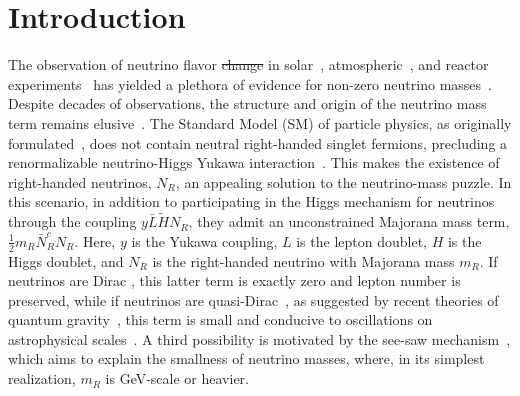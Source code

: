 \documentclass[
    aps,
    prd,
    reprint,
    amsmath,
    amssymb,
    nofootinbib,
    superscriptaddress,
    floatfix
]{revtex4-2}
\providecommand{\DIFaddtex}[1]{{\protect\color{blue}\uwave{#1}}} %
\providecommand{\DIFdeltex}[1]{{\protect\color{red}\sout{#1}}}                      %
\providecommand{\DIFaddbegin}{} %
\providecommand{\DIFaddend}{} %
\providecommand{\DIFdelbegin}{} %
\providecommand{\DIFdelend}{} %
\providecommand{\DIFadd}[1]{\texorpdfstring{\DIFaddtex{#1}}{#1}} %
\providecommand{\DIFdel}[1]{\texorpdfstring{\DIFdeltex{#1}}{}} %
\newcommand{\DIFscaledelfig}{0.5}
\newlength{\DIFdelgraphicswidth} %
\newlength{\DIFdelgraphicsheight} %
\newcommand{\DIFaddincludegraphics}[2][]{{\color{blue}\fbox{\DIFOincludegraphics[#1]{#2}}}} %
\newcommand{\DIFdelincludegraphics}[2][]{%
\sbox{\DIFdelgraphicsbox}{\DIFOincludegraphics[#1]{#2}}%
\settoboxwidth{\DIFdelgraphicswidth}{\DIFdelgraphicsbox} %
\settoboxtotalheight{\DIFdelgraphicsheight}{\DIFdelgraphicsbox} %
\scalebox{\DIFscaledelfig}{%
\parbox[b]{\DIFdelgraphicswidth}{\usebox{\DIFdelgraphicsbox}\\[-\baselineskip] \rule{\DIFdelgraphicswidth}{0em}}\llap{\resizebox{\DIFdelgraphicswidth}{\DIFdelgraphicsheight}{%
\setlength{\unitlength}{\DIFdelgraphicswidth}%
\begin{picture}(1,1)%
\thicklines\linethickness{2pt} %
{\color[rgb]{1,0,0}\put(0,0){\framebox(1,1){}}}%
{\color[rgb]{1,0,0}\put(0,0){\line( 1,1){1}}}%
{\color[rgb]{1,0,0}\put(0,1){\line(1,-1){1}}}%
\end{picture}%
}\hspace*{3pt}}} %
} %
\DeclareRobustCommand{\DIFaddbegin}{\DIFOaddbegin \let\includegraphics\DIFaddincludegraphics} %
\DeclareRobustCommand{\DIFaddend}{\DIFOaddend \let\includegraphics\DIFOincludegraphics} %
\DeclareRobustCommand{\DIFdelbegin}{\DIFOdelbegin \let\includegraphics\DIFdelincludegraphics} %
\DeclareRobustCommand{\DIFdelend}{\DIFOaddend \let\includegraphics\DIFOincludegraphics} %
\begin{document}
\maketitle
\tableofcontents    




\section{\label{sec:introduction}Introduction}

The observation of neutrino flavor \DIFdelbegin \DIFdel{change }\DIFdelend \DIFaddbegin \DIFadd{oscillations }\DIFaddend in solar~\cite{Cleveland:1998nv, Super-Kamiokande:2001ljr, Borexino:2008dzn, Gann:2021ndb}, atmospheric~\cite{Super-Kamiokande:1998kpq, IceCube:2013pav, ANTARES:2018rtf, IceCubeCollaboration:2023wtb, Arguelles:2022hrt}, and reactor experiments~\cite{DayaBay:2012fng, RENO:2012mkc, Vogel:2015wua} has yielded a plethora of evidence for non-zero neutrino masses~\cite{Esteban:2018azc}.
Despite decades of observations, the structure and origin of the neutrino mass term remains elusive~\cite{Mohapatra:2005wg}.
The Standard Model (SM) of particle physics, as originally formulated~\cite{Weinberg:1967tq, Weinberg:2004kv}, does not contain neutral right-handed singlet fermions, precluding a renormalizable neutrino-Higgs Yukawa interaction~\cite{Higgs:1964pj}.
This makes the existence of right-handed neutrinos, $N_R$, an appealing solution to the neutrino-mass puzzle.
In this scenario, in addition to participating in the Higgs mechanism for neutrinos through the coupling $y \bar L \tilde H N_R$, they admit an unconstrained Majorana mass term, $\frac{1}{2} m_R \bar N_R^c N_R$.
Here, $y$ is the Yukawa coupling, $L$ is the lepton doublet, $H$ is the Higgs doublet, and $N_R$ is the right-handed neutrino with Majorana mass $m_R$.
If neutrinos are Dirac \DIFaddbegin \DIFadd{particles}\DIFaddend , this latter term is exactly zero and lepton number is preserved, while if neutrinos are quasi-Dirac~\cite{Valle:1983dk}, as suggested by recent theories of quantum gravity~\cite{Ooguri:2016pdq, Arkani-Hamed:2007ryu, Gonzalo:2021zsp, Vafa:2024fpx}, this term is small and conducive to oscillations on astrophysical scales~\cite{Crocker:2001zs, Keranen:2003xd,Beacom:2003eu, Esmaili:2009fk, Esmaili:2012ac, Shoemaker:2015qul, Carloni:2022cqz}.
A third possibility is motivated by the see-saw mechanism~\cite{Minkowski:1977sc, Mohapatra:1979ia, GellMann:1980vs, Yanagida:1979as, Lazarides:1980nt, Mohapatra:1980yp, Schechter:1980gr, Cheng:1980qt, Foot:1988aq}, which aims to explain the smallness of neutrino masses, where, in its simplest realization, $m_R$ is GeV-scale or heavier.
\end{document}
